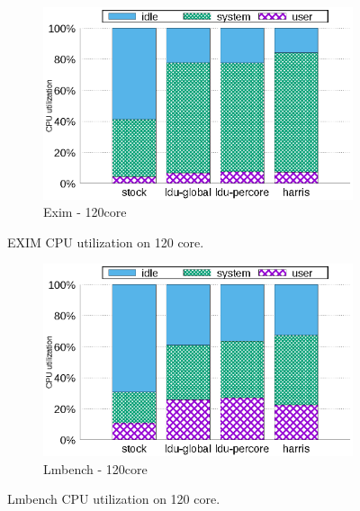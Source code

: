 \begin{figure}[tb]
    \centering
    \begin{subfigure}[b]{1\textwidth}
  \begin{center}
        \includegraphics[scale=0.8]{graph/exim_cpuutils.eps}
        \caption{Exim - 120core}
  \end{center}
    \end{subfigure}
    \centering
    \caption{EXIM CPU utilization on 120 core. }
    \label{fig:utilization_exim}
    
\end{figure}



\begin{figure}[tb]
    \centering
    \begin{subfigure}[b]{1\textwidth}
  \begin{center}
        \includegraphics[scale=0.8]{graph/lmbench_cpuutils.eps}
        \caption{Lmbench - 120core}
  \end{center}
    \end{subfigure}
        \centering
    \caption{Lmbench CPU utilization on 120 core.}
    \label{fig:utilization_lmbench}
    
\end{figure}



